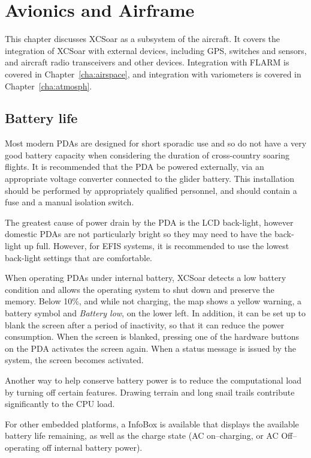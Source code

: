 \chapter{Avionics and Airframe}\label{cha:avionics-airframe}

This chapter discusses XCSoar as a subsystem of the aircraft.  It
covers the integration of XCSoar with external devices, including GPS,
switches and sensors, and aircraft radio transceivers and other
devices.  Integration with FLARM is covered in
Chapter~\ref{cha:airspace}, and integration with variometers is
covered in Chapter~\ref{cha:atmosph}.

\section{Battery life}

Most modern PDAs are designed for short sporadic use and so do not
have a very good battery capacity when considering the duration of
cross-country soaring flights.  It is recommended that the PDA be powered
externally, via an appropriate voltage converter connected to the glider battery. 
This installation should be performed by appropriately qualified personnel, 
and should contain a fuse and a manual isolation switch.

The greatest cause of power drain by the PDA is the LCD back-light,
however domestic PDAs are not particularly bright so they may need to
have the back-light up full. However, for EFIS systems,
it is recommended to use the lowest back-light settings that are
comfortable.

When operating PDAs under internal battery, XCSoar detects a low
battery condition and allows the operating system to shut down and
preserve the memory.  Below 10\%, and while not charging, the map
shows a yellow warning, a battery symbol and \emph{Battery low},
on the lower left.
In addition, it can be set up to blank the screen after a period of
inactivity, so that it can reduce the power
consumption.  When the screen is blanked, pressing one of the hardware
buttons on the PDA activates the screen again.  When a status message
is issued by the system, the screen becomes activated.

Another way to help conserve battery power is to reduce the
computational load by turning off certain features.  Drawing terrain
and long snail trails contribute significantly to the CPU load.

For other embedded platforms, a  InfoBox is available that 
displays the available battery life remaining, as well as the charge state 
(AC on--charging, or AC Off--operating off internal battery power).

